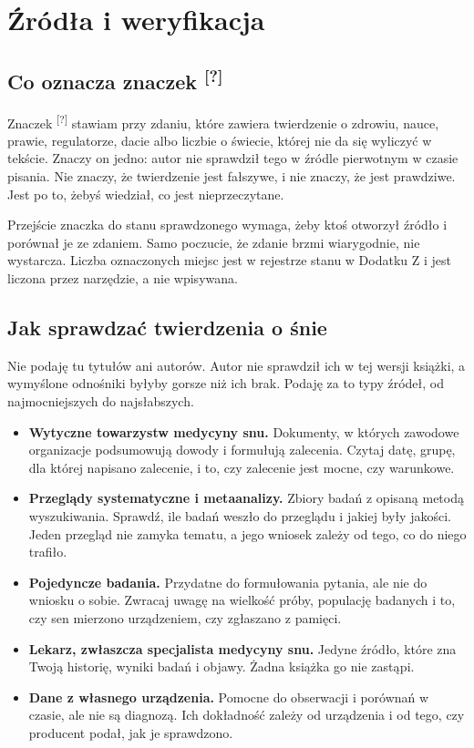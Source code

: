 \chapter{Źródła i weryfikacja}

\section{Co oznacza znaczek \textsuperscript{[?]}}

Znaczek \textsuperscript{\textcolor{accentorange}{[?]}} stawiam przy zdaniu, które zawiera twierdzenie o zdrowiu, nauce, prawie, regulatorze, dacie albo liczbie o świecie, której nie da się wyliczyć w tekście. Znaczy on jedno: autor nie sprawdził tego w źródle pierwotnym w czasie pisania. Nie znaczy, że twierdzenie jest fałszywe, i nie znaczy, że jest prawdziwe. Jest po to, żebyś wiedział, co jest nieprzeczytane.

Przejście znaczka do stanu sprawdzonego wymaga, żeby ktoś otworzył źródło i porównał je ze zdaniem. Samo poczucie, że zdanie brzmi wiarygodnie, nie wystarcza. Liczba oznaczonych miejsc jest w rejestrze stanu w Dodatku Z i jest liczona przez narzędzie, a nie wpisywana.

\section{Jak sprawdzać twierdzenia o śnie}

Nie podaję tu tytułów ani autorów. Autor nie sprawdził ich w tej wersji książki, a wymyślone odnośniki byłyby gorsze niż ich brak. Podaję za to typy źródeł, od najmocniejszych do najsłabszych.

\begin{itemize}
\item \textbf{Wytyczne towarzystw medycyny snu.} Dokumenty, w których zawodowe organizacje podsumowują dowody i formułują zalecenia. Czytaj datę, grupę, dla której napisano zalecenie, i to, czy zalecenie jest mocne, czy warunkowe.
\item \textbf{Przeglądy systematyczne i metaanalizy.} Zbiory badań z opisaną metodą wyszukiwania. Sprawdź, ile badań weszło do przeglądu i jakiej były jakości. Jeden przegląd nie zamyka tematu, a jego wniosek zależy od tego, co do niego trafiło.
\item \textbf{Pojedyncze badania.} Przydatne do formułowania pytania, ale nie do wniosku o sobie. Zwracaj uwagę na wielkość próby, populację badanych i to, czy sen mierzono urządzeniem, czy zgłaszano z pamięci.
\item \textbf{Lekarz, zwłaszcza specjalista medycyny snu.} Jedyne źródło, które zna Twoją historię, wyniki badań i objawy. Żadna książka go nie zastąpi.
\item \textbf{Dane z własnego urządzenia.} Pomocne do obserwacji i porównań w czasie, ale nie są diagnozą. Ich dokładność zależy od urządzenia i od tego, czy producent podał, jak je sprawdzono.
\end{itemize}

